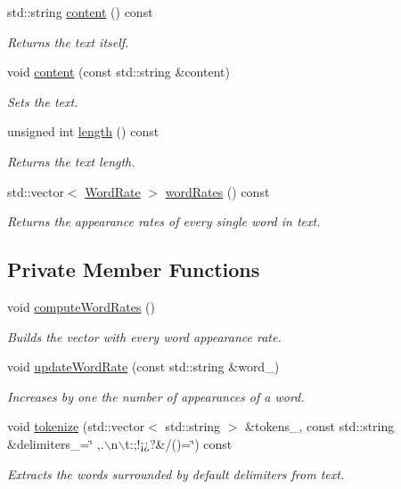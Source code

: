 \begin{CompactItemize}
std::string \hyperlink{class_text_58a34fa2cfd0c240a7517132017b6a83}{content} () const 
\begin{CompactList}\small\item\em Returns the text itself. \item\end{CompactList}\item 
void \hyperlink{class_text_eca454f28010b6b3e7bd0d771b8eaeb2}{content} (const std::string \&content)
\begin{CompactList}\small\item\em Sets the text. \item\end{CompactList}\item 
unsigned int \hyperlink{class_text_8d76db538f8617fb8880ba3e4ff3e6a5}{length} () const 
\begin{CompactList}\small\item\em Returns the text length. \item\end{CompactList}\item 
std::vector$<$ \hyperlink{_word_rate_8h_8cfef8793106ac45a83059bd5573cbb3}{WordRate} $>$ \hyperlink{class_text_1387d9767b65f80355f1bdede26a0f7b}{wordRates} () const 
\begin{CompactList}\small\item\em Returns the appearance rates of every single word in text. \item\end{CompactList}\end{CompactItemize}
\subsection*{Private Member Functions}
\begin{CompactItemize}
\item 
void \hyperlink{class_text_8239e13039bcc1c713f66f1236693706}{computeWordRates} ()
\begin{CompactList}\small\item\em Builds the vector with every word appearance rate. \item\end{CompactList}\item 
void \hyperlink{class_text_7466754bf64f0c22b291edb2bd14ba99}{updateWordRate} (const std::string \&word\_\-)
\begin{CompactList}\small\item\em Increases by one the number of appearances of a word. \item\end{CompactList}\item 
void \hyperlink{class_text_cf1ad9772327a1d03d03c879e5bfcc24}{tokenize} (std::vector$<$ std::string $>$ \&tokens\_\-, const std::string \&delimiters\_\-=\char`\"{} ,.$\backslash$n$\backslash$t:;!¡¿?\&/()=\char`\"{}) const 
\begin{CompactList}\small\item\em Extracts the words surrounded by default delimiters from text. \item\end{CompactList}\end{CompactItemize}
